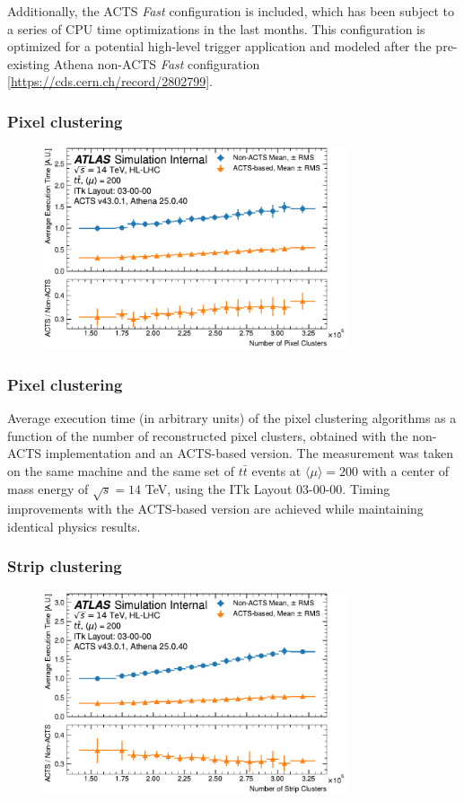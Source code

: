 \documentclass[aspectratio=169]{beamer}
\begin{document}
\begin{frame}
Additionally, the ACTS \textit{Fast} configuration is included, which has been subject to a series of CPU time optimizations in the last months. This configuration is optimized for a potential high-level trigger application and modeled after the pre-existing Athena non-ACTS \textit{Fast} configuration [\href{ATLAS-TDR-029-ADD-1}{https://cds.cern.ch/record/2802799}].
\end{frame}

\begin{frame}
\frametitle{Pixel clustering}
\begin{figure}[h]
    \centering
    \includegraphics[width=0.8\textwidth]{plots/clustering_pixel.pdf}
\end{figure}
\end{frame}

\begin{frame}
\frametitle{Pixel clustering}
Average execution time (in arbitrary units) of the pixel clustering algorithms as a function of the number of reconstructed pixel clusters, obtained with the non-ACTS implementation and an ACTS-based version. The measurement was taken on the same machine and the same set of $t\bar{t}$ events at $\langle \mu \rangle = 200$ with a center of mass energy of $\sqrt{s}=14$ TeV, using the ITk Layout 03-00-00. Timing improvements with the ACTS-based version are achieved while maintaining identical physics results.
\end{frame}

\begin{frame}
\frametitle{Strip clustering}
\begin{figure}[h]
    \centering
    \includegraphics[width=0.8\textwidth]{plots/clustering_strip.pdf}
\end{figure}
\end{frame}
\end{document}
